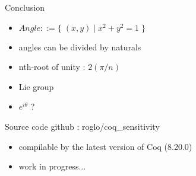 \documentclass{beamer}
\begin{document}
\begin{frame}{Conclusion}
    \begin{itemize}
    \item $Angle ::= \{ \; (x, y) \; | \; x^2+y^2=1 \; \}$
    \item angles can be divided by naturals
    \end{itemize}
    \vspace{3mm}
    \begin{itemize}
    \item nth-root of unity : $2(\pi / n)$
    \item Lie group
    \item $e^{i \theta}$ ?
    \end{itemize}
\end{frame}

\begin{frame}{Source code}
  github : roglo/coq\_sensitivity \\
  \begin{itemize}
  \item compilable by the latest version of Coq (8.20.0)
  \item work in progress...
  \end{itemize}
\end{frame}
\end{document}
